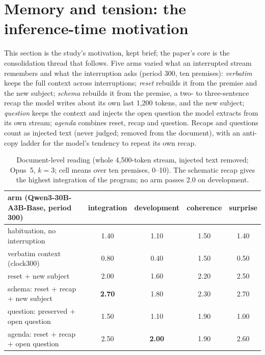 \documentclass[11pt]{article}
\begin{document}
\section{Memory and tension: the inference-time motivation}
\label{sec:memory}

This section is the study's motivation, kept brief; the paper's core is
the consolidation thread that follows. Five arms varied what an
interrupted stream remembers and what the interruption asks (period 300,
ten premises): \emph{verbatim} keeps the full context across
interruptions; \emph{reset} rebuilds it from the premise and the new
subject; \emph{schema} rebuilds it from the premise, a two- to
three-sentence recap the model writes about its own last 1{,}200 tokens,
and the new subject; \emph{question} keeps the context and injects the
open question the model extracts from its own stream; \emph{agenda}
combines reset, recap and question. Recaps and questions count as
injected text (never judged; removed from the document), with an
anti-copy ladder for the model's tendency to repeat its own recap.

\begin{table}[t]
\centering\small
\begin{tabular}{@{}lcccc@{}}
\toprule
arm (Qwen3-30B-A3B-Base, period 300) & integration & development & coherence & surprise \\
\midrule
habituation, no interruption & 1.40 & 1.10 & 1.50 & 1.40 \\
verbatim context (clock300) & 0.80 & 0.40 & 1.50 & 0.50 \\
reset + new subject & 2.00 & 1.60 & 2.20 & 2.50 \\
schema: reset + recap + new subject & \textbf{2.70} & 1.80 & 2.30 & 2.70 \\
question: preserved + open question & 1.50 & 1.10 & 1.90 & 1.00 \\
agenda: reset + recap + open question & 2.50 & \textbf{2.00} & 1.90 & 2.60 \\
\bottomrule
\end{tabular}
\caption{Document-level reading (whole 4{,}500-token stream, injected text
removed; Opus~5, $k=3$; cell means over ten premises, 0--10). The schematic
recap gives the highest integration of the program; no arm passes 2.0 on
development.}
\label{tab:doc}
\end{table}
\end{document}
